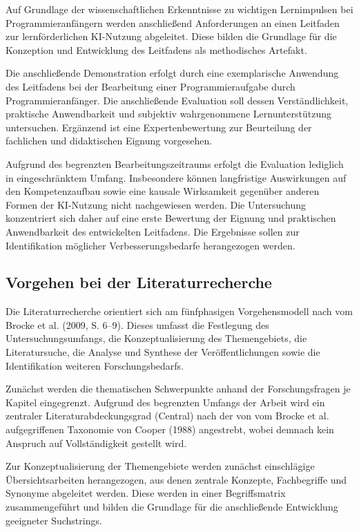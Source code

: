 Auf Grundlage der wissenschaftlichen Erkenntnisse zu wichtigen Lernimpulsen bei Programmieranfängern werden anschließend Anforderungen an einen Leitfaden zur lernförderlichen KI-Nutzung abgeleitet. Diese bilden die Grundlage für die Konzeption und Entwicklung des Leitfadens als methodisches Artefakt.

Die anschließende Demonstration erfolgt durch eine exemplarische Anwendung des Leitfadens bei der Bearbeitung einer Programmieraufgabe durch Programmieranfänger. Die anschließende Evaluation soll dessen Verständlichkeit, praktische Anwendbarkeit und subjektiv wahrgenommene Lernunterstützung untersuchen. Ergänzend ist eine Expertenbewertung zur Beurteilung der fachlichen und didaktischen Eignung vorgesehen.

Aufgrund des begrenzten Bearbeitungszeitraums erfolgt die Evaluation lediglich in eingeschränktem Umfang. Insbesondere können langfristige Auswirkungen auf den Kompetenzaufbau sowie eine kausale Wirksamkeit gegenüber anderen Formen der KI-Nutzung nicht nachgewiesen werden. Die Untersuchung konzentriert sich daher auf eine erste Bewertung der Eignung und praktischen Anwendbarkeit des entwickelten Leitfadens. Die Ergebnisse sollen zur Identifikation möglicher Verbesserungsbedarfe herangezogen werden.

\subsection{Vorgehen bei der Literaturrecherche}
Die Literaturrecherche orientiert sich am fünfphasigen Vorgehensmodell nach vom Brocke et al. (2009, S. 6–9). Dieses umfasst die Festlegung des Untersuchungsumfangs, die Konzeptualisierung des Themengebiets, die Literatursuche, die Analyse und Synthese der Veröffentlichungen sowie die Identifikation weiteren Forschungsbedarfs.

Zunächst werden die thematischen Schwerpunkte anhand der Forschungsfragen je Kapitel eingegrenzt. Aufgrund des begrenzten Umfangs der Arbeit wird ein zentraler Literaturabdeckungsgrad (Central) nach der von vom Brocke et al. aufgegriffenen Taxonomie von Cooper (1988) angestrebt, wobei demnach kein Anspruch auf Vollständigkeit gestellt wird.

Zur Konzeptualisierung der Themengebiete werden zunächst einschlägige Übersichtsarbeiten herangezogen, aus denen zentrale Konzepte, Fachbegriffe und Synonyme abgeleitet werden. Diese werden in einer Begriffsmatrix zusammengeführt und bilden die Grundlage für die anschließende Entwicklung geeigneter Suchstrings.


